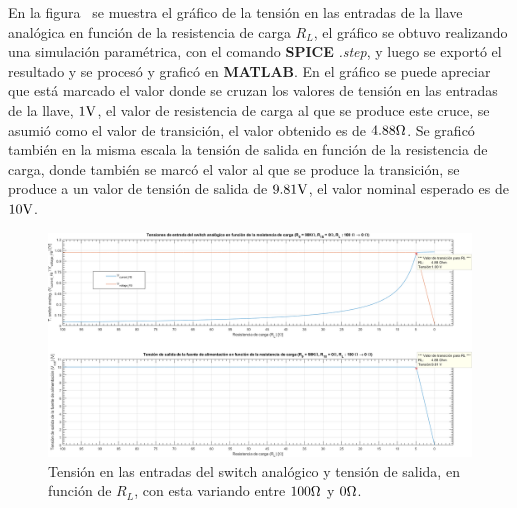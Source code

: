 \vspace{1.5cm}


En la figura~ se muestra el gráfico de la tensión en las entradas de la llave analógica en función de la resistencia de carga $R_{L}$, el gráfico se obtuvo realizando una simulación paramétrica, con el comando \textbf{SPICE} \textit{.step}, y luego se exportó el resultado y se procesó y graficó en \textbf{MATLAB}. En el gráfico se puede apreciar que está marcado el valor donde se cruzan los valores de tensión en las entradas de la llave, $1 \si[per-mode=symbol]{\volt}$, el valor de resistencia de carga al que se produce este cruce, se asumió como el valor de transición, el valor obtenido es de $4.88 \si[per-mode=symbol]{\ohm}$. Se graficó también en la misma escala la tensión de salida en función de la resistencia de carga, donde también se marcó el valor al que se produce la transición, se produce a un valor de tensión de salida de $9.81 \si[per-mode=symbol]{\volt}$, el valor nominal esperado es de $10 \si[per-mode=symbol]{\volt}$.


\vfill

\clearpage

\begin{figure}[H] %
\begin{center}
\includegraphics[width=1.1 \textwidth, angle=90]{./img/preguntas/p8.png}
\caption{\label{fig:fig_p8_maximun_load_for_regulation}\footnotesize{Tensión en las entradas del switch analógico y tensión de salida, en función de $R_{L}$, con esta variando entre $100 \si[per-mode=symbol]{\ohm}$ y $0 \si[per-mode=symbol]{\ohm}$.}}
\end{center}
\end{figure}



\clearpage